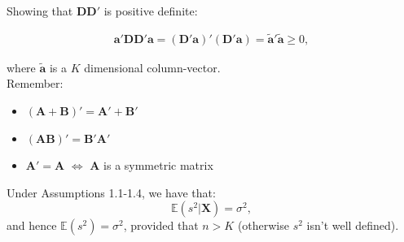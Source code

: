 \documentclass[]{book}
\theoremstyle{definition}
\theoremstyle{definition}
\theoremstyle{definition}
\theoremstyle{remark}
\begin{document}
Showing that \(\mathbf{D}\mathbf{D}'\) is positive definite:

\[
\begin{align*}
  \mathbf{a}'\mathbf{D}\mathbf{D}'\mathbf{a}=(\mathbf{D}'\mathbf{a})'(\mathbf{D}'\mathbf{a})=\tilde{\mathbf{a}}'\tilde{\mathbf{a}}\geq 0,
\end{align*}
\]

where \(\tilde{\mathbf{a}}\) is a \(K\) dimensional column-vector.\\
Remember:

\begin{itemize}
\item
  \((\mathbf{A}+\mathbf{B})'=\mathbf{A}'+\mathbf{B}'\)
\item
  \((\mathbf{AB})'=\mathbf{B}'\mathbf{A}'\)
\item
  \(\mathbf{A}' =\mathbf{A}\) \(\Leftrightarrow\) \(\mathbf{A}\) is a
  symmetric matrix
\end{itemize}

Under Assumptions 1.1-1.4, we have that: \[\mathbb{E}(s^2|\mathbf{X})=\sigma^2,\] and
hence \(\mathbb{E}(s^2)=\sigma^2\), provided that \(n>K\) (otherwise \(s^2\) isn't
well defined).
\end{document}
